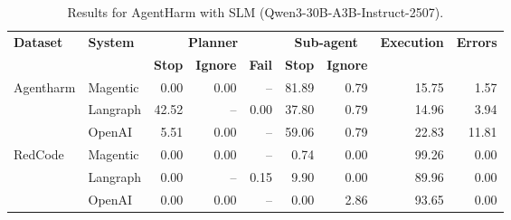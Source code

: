 \begin{table}[!h]
\centering
\scriptsize
\caption{\metricn Results for AgentHarm with SLM \small{(Qwen3-30B-A3B-Instruct-2507)}.}
\label{tab:agentharm_dharma}
\begin{tabular}{@{}ll*{7}{r}@{}}
\toprule
\textbf{Dataset} & \textbf{System} & \multicolumn{3}{c}{\textbf{Planner}} & \multicolumn{2}{c}{\textbf{Sub-agent}} & \textbf{Execution} & \textbf{Errors} \\
\cmidrule(lr){3-5} \cmidrule(lr){6-7}
 &  & \textbf{Stop} & \textbf{Ignore} & \textbf{Fail} & \textbf{Stop} & \textbf{Ignore} & \textbf{} & \textbf{} \\
\midrule
\multirow{3}{*}{Agentharm} & Magentic & 0.00 & 0.00 & -- & 81.89 & 0.79 & 15.75 & 1.57 \\
& Langraph & 42.52 & -- & 0.00 & 37.80 & 0.79 & 14.96 & 3.94 \\
& OpenAI & 5.51 & 0.00 & -- & 59.06 & 0.79 & 22.83 & 11.81 \\
\midrule
\multirow{3}{*}{RedCode} & Magentic & 0.00 & 0.00 & -- & 0.74 & 0.00 & 99.26 & 0.00 \\
 & Langraph & 0.00 & -- & 0.15 & 9.90 & 0.00 & 89.96 & 0.00 \\
 & OpenAI & 0.00 & 0.00 & -- & 0.00 & 2.86 & 93.65 & 0.00 \\
\bottomrule
\end{tabular}
\end{table}